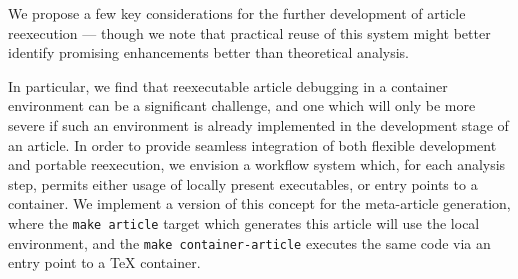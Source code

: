 We propose a few key considerations for the further development of article reexecution — though we note that practical reuse of this system might better identify promising enhancements better than theoretical analysis.

In particular, we find that reexecutable article debugging in a container environment can be a significant challenge, and one which will only be more severe if such an environment is already implemented in the development stage of an article.
In order to provide seamless integration of both flexible development and portable reexecution, we envision a workflow system which, for each analysis step, permits either usage of locally present executables, or entry points to a container.
We implement a version of this concept for the meta-article generation, where the \texttt{make article} target which generates this article will use the local environment, and the \texttt{make container-article} executes the same code via an entry point to a \TeX{} container.

